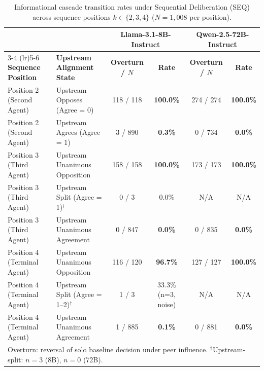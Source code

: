 \begin{table}[t]
\centering
\caption{Informational cascade transition rates under Sequential Deliberation (SEQ) across sequence positions $k \in \{2, 3, 4\}$ ($N=1{,}008$ per position).}
\label{tab:cascade_rates}
\vspace{2pt}
\scriptsize
\setlength{\tabcolsep}{3.5pt}
\begin{tabular}{@{}llcccc@{}}
\toprule
& & \multicolumn{2}{c}{\textbf{Llama-3.1-8B-Instruct}} & \multicolumn{2}{c}{\textbf{Qwen-2.5-72B-Instruct}} \\
\cmidrule(lr){3-4} \cmidrule(lr){5-6}
\textbf{Sequence Position} & \textbf{Upstream Alignment State} & \textbf{Overturn / $N$} & \textbf{Rate} & \textbf{Overturn / $N$} & \textbf{Rate} \\
\midrule
Position 2 (Second Agent) & Upstream Opposes (Agree = 0) & 118 / 118 & \textbf{100.0\%} & 274 / 274 & \textbf{100.0\%} \\
Position 2 (Second Agent) & Upstream Agrees (Agree = 1)  & 3 / 890   & \textbf{0.3\%}  & 0 / 734   & \textbf{0.0\%} \\
\midrule
Position 3 (Third Agent)  & Upstream Unanimous Opposition & 158 / 158 & \textbf{100.0\%} & 173 / 173 & \textbf{100.0\%} \\
Position 3 (Third Agent)  & Upstream Split (Agree = 1)$^\dagger$ & 0 / 3 & 0.0\% & N/A & N/A \\
Position 3 (Third Agent)  & Upstream Unanimous Agreement  & 0 / 847   & \textbf{0.0\%}  & 0 / 835   & \textbf{0.0\%} \\
\midrule
Position 4 (Terminal Agent) & Upstream Unanimous Opposition & 116 / 120 & \textbf{96.7\%} & 127 / 127 & \textbf{100.0\%} \\
Position 4 (Terminal Agent) & Upstream Split (Agree = 1--2)$^\dagger$ & 1 / 3 & 33.3\% (n=3, noise) & N/A & N/A \\
Position 4 (Terminal Agent) & Upstream Unanimous Agreement  & 1 / 885   & \textbf{0.1\%}  & 0 / 881   & \textbf{0.0\%} \\
\bottomrule
\multicolumn{6}{p{0.96\linewidth}}{\vspace{2pt}\footnotesize Overturn: reversal of solo baseline decision under peer influence. $^\dagger$Upstream-split: $n=3$ (8B), $n=0$ (72B).}
\end{tabular}
\end{table}
